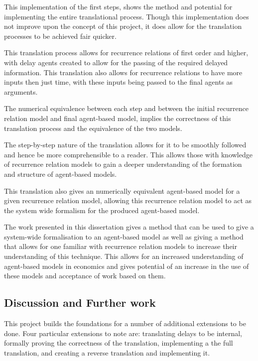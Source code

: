 \documentclass{article}
\begin{document}
This implementation of the first steps, shows the method and potential for implementing the entire translational process. Though this implementation does not improve upon the concept of this project, it does allow for the translation processes to be achieved fair quicker.  

This translation process allows for recurrence relations of first order and higher, with delay agents created to allow for the passing of the required delayed information. This translation also allows for recurrence relations to have more inputs then just time, with these inputs being passed to the final agents as arguments.   

The numerical equivalence between each step and between the initial recurrence relation model and final agent-based model, implies the correctness of this translation process and the  equivalence of the two models.  

The step-by-step nature of the translation allows for it to be smoothly followed and hence be more comprehensible to a reader. This allows those with knowledge of recurrence relation models to gain a deeper understanding of the formation and structure of agent-based models. 

This translation also gives an numerically equivalent agent-based model for a given recurrence relation model, allowing this recurrence relation model to act as the system wide formalism for the produced agent-based model. 

The work presented in this dissertation gives a method that can be used to give a system-wide formalisation to an agent-based model as well as giving a method that allows for one familiar with recurrence relation models to increase their understanding of this technique. This allows for an increased understanding of agent-based models in economics and gives potential of an increase in the use of these models and acceptance of work based on them.   

\subsection{Discussion and Further work } \label{furtherwork}


This project builds the foundations for a number of additional extensions to be done. Four particular extensions to note are: translating delays to be internal, formally proving the correctness of the translation, implementing a the full translation, and creating a reverse translation and implementing it.     
\end{document}
